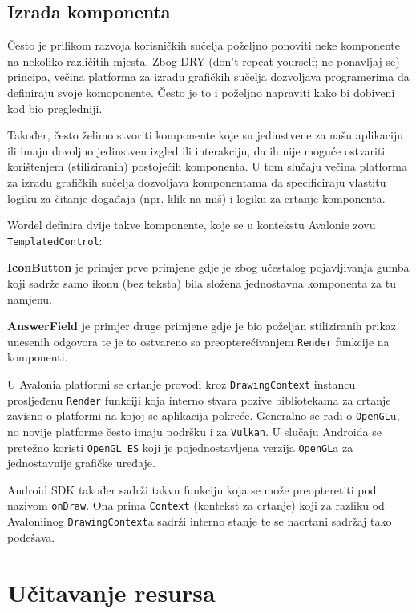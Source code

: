 \documentclass[12pt,a4paper]{report}
\begin{document}
\newpage
\subsection{Izrada komponenta}

Često je prilikom razvoja korisničkih sučelja poželjno ponoviti neke komponente
na nekoliko različitih mjesta. Zbog DRY (don't repeat yourself; ne ponavljaj se)
principa, večina platforma za izradu grafičkih sučelja dozvoljava programerima
da definiraju svoje komoponente. Često je to i poželjno napraviti kako bi
dobiveni kod bio pregledniji.

Također, često želimo stvoriti komponente koje su jedinstvene za našu aplikaciju
ili imaju dovoljno jedinstven izgled ili interakciju, da ih nije moguće
ostvariti korištenjem (stiliziranih) postojećih komponenta. U tom slučaju večina
platforma za izradu grafičkih sučelja dozvoljava komponentama da specificiraju
vlastitu logiku za čitanje događaja (npr. klik na miš) i logiku za crtanje
komponenta.

Wordel definira dvije takve komponente, koje se u kontekstu Avalonie zovu
\verb|TemplatedControl|:

\textbf{IconButton} je primjer prve primjene gdje je zbog učestalog
pojavljivanja gumba koji sadrže samo ikonu (bez teksta) bila složena jednostavna
komponenta za tu namjenu.

\textbf{AnswerField} je primjer druge primjene gdje je bio poželjan stiliziranih
prikaz unesenih odgovora te je to ostvareno sa preopterećivanjem \verb|Render|
funkcije na komponenti.

U Avalonia platformi se crtanje provodi kroz \verb|DrawingContext| instancu
prosljeđenu \verb|Render| funkciji koja interno stvara pozive bibliotekama za
crtanje zavisno o platformi na kojoj se aplikacija pokreće. Generalno se radi o
\verb|OpenGL|u, no novije platforme često imaju podršku i za \verb|Vulkan|.
U slučaju Androida se pretežno koristi \verb|OpenGL ES| koji je pojednostavljena
verzija \verb|OpenGL|a za jednostavnije grafičke uređaje.

Android SDK također sadrži takvu funkciju koja se može preopteretiti pod nazivom
\verb|onDraw|. Ona prima \verb|Context| (kontekst za crtanje) koji za razliku od
Avaloniinog \verb|DrawingContext|a sadrži interno stanje te se nacrtani sadržaj
tako podešava.

\section{Učitavanje resursa}
\end{document}
